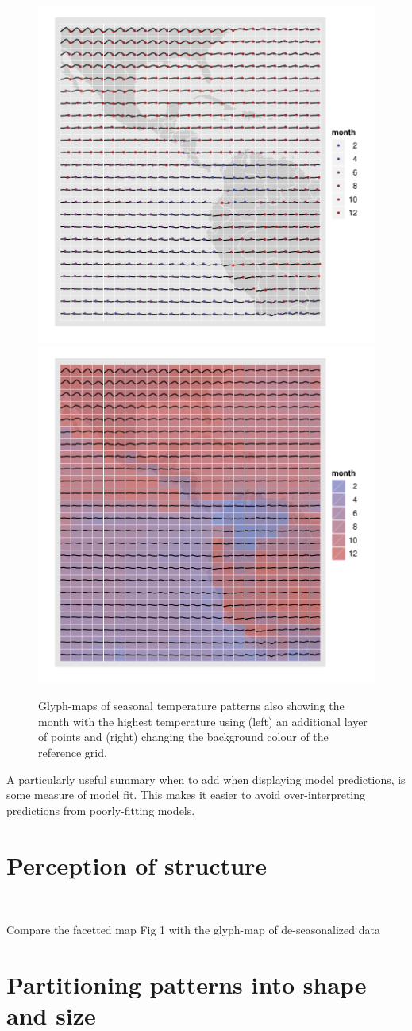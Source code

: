 \documentclass[oneside]{article}
\begin{document}
\begin{figure}[htbp]
  \centering
  \includegraphics[width=0.5\linewidth]{ref-max-1}%
  \includegraphics[width=0.5\linewidth]{ref-max-2}
  \caption{Glyph-maps of seasonal temperature patterns also showing the month with the highest temperature using (left) an additional layer of points and (right) changing the background colour of the reference grid.}
  \label{fig:ref-adv}
\end{figure}

A particularly useful summary when to add when displaying model predictions, is some measure of model fit. This makes it easier to avoid over-interpreting predictions from poorly-fitting models.

\section{Perception of structure}~\label{sec:scale}

Compare the facetted map Fig 1 with the glyph-map of de-seasonalized data

\section{Partitioning patterns into shape and size}~\label{sec:scale}
\end{document}
